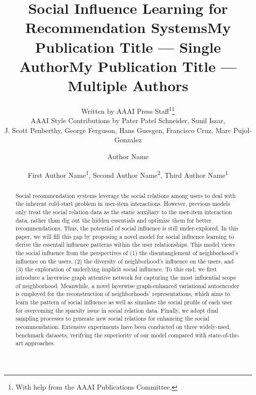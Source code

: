 \documentclass[letterpaper]{article} %
\title{Social Influence Learning for Recommendation Systems}
\author{
    Written by AAAI Press Staff\textsuperscript{\rm 1}\thanks{With help from the AAAI Publications Committee.}\\
    AAAI Style Contributions by Pater Patel Schneider,
    Sunil Issar,\\
    J. Scott Penberthy,
    George Ferguson,
    Hans Guesgen,
    Francisco Cruz\equalcontrib,
    Marc Pujol-Gonzalez\equalcontrib
}
\title{My Publication Title --- Single Author}
\author {
    Author Name
}
\title{My Publication Title --- Multiple Authors}
\author {
    First Author Name\textsuperscript{\rm 1},
    Second Author Name\textsuperscript{\rm 2},
    Third Author Name\textsuperscript{\rm 1}
}
\begin{document}
\maketitle

\begin{abstract}
Social recommendation systems leverage the social relations among users to deal with the inherent cold-start problem in user-item interactions. However, previous models only treat the social relation data as the static auxiliary to the user-item interaction data, rather than dig out the hidden essentials and optimize them for better recommendations. Thus, the potential of social influence is still under-explored. In this paper, we will fill this gap by proposing a novel model for social influence learning to derive the essentail influence patterns within the user relationships. This model views the social influence from the perspectives of (1) the disentanglement of neighborhood's influence on the users, (2) the diversity of neighborhood's influence on the users, and (3) the exploration of underlying implicit social influence. To this end, we first introduce a layerwise graph attentive network for capturing the most influential scope of neighborhood. Meanwhile, a novel layerwise graph-enhanced variational autoencoder is employed for the reconstruction of neighborhoods' representations, which aims to learn the pattern of social influence as well as simulate the social profile of each user for overcoming the sparsity issue in social relation data. Finally, we adopt dual sampling processes to generate new social relations for enhancing the social recommendation. Extensive experiments have been conducted on three widely-used benchmark datasets, verifying the superiority of our model compared with state-of-the-art approaches.
\end{abstract}
\end{document}
